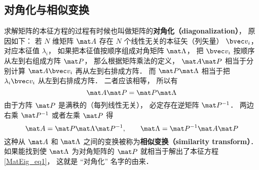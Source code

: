 \subsection{对角化与相似变换}
求解矩阵的本征方程的过程有时候也叫做矩阵的\textbf{对角化（diagonalization）}， 原因如下： 若 $N$ 维矩阵 $\mat A$ 存在 $N$ 个线性无关的本征矢（列矢量） $\bvec v_i$， 对应本征值 $\lambda_i$， 如果把本征值按顺序组成对角矩阵 $\mat \Lambda$， 把 $\bvec v_i$ 按顺序从左到右组成方阵 $\mat P$， 那么根据矩阵乘法的定义， $\mat A \mat P$ 相当于分别计算 $\mat A\bvec v_i$ 再从左到右排成方阵． 而 $\mat P\mat\Lambda$ 相当于把 $\lambda_i\bvec v_i$ 从左到右排成方阵． 二者应该相等， 所以有
\begin{equation}
\mat A \mat P = \mat P\mat\Lambda
\end{equation}
由于方阵 $\mat P$ 是满秩的（每列线性无关）， 必定存在逆矩阵%
$\mat P^{-1}$． 两边右乘 $\mat P^{-1}$ 或者左乘 $\mat P$ 得
\begin{equation}\label{MatEig_eq3}
\mat A = \mat P\mat\Lambda\mat P^{-1}, \qquad
\mat \Lambda = \mat P^{-1}\mat A \mat P
\end{equation}
这种从 $\mat A$ 和 $\mat\Lambda$ 之间的变换被称为\textbf{相似变换（similarity transform）}． 如果能找到使 $\mat\Lambda$ 为对角矩阵的 $\mat P$ 就相当于解出了本征方程\autoref{MatEig_eq1}， 这就是 “对角化” 名字的由来．

